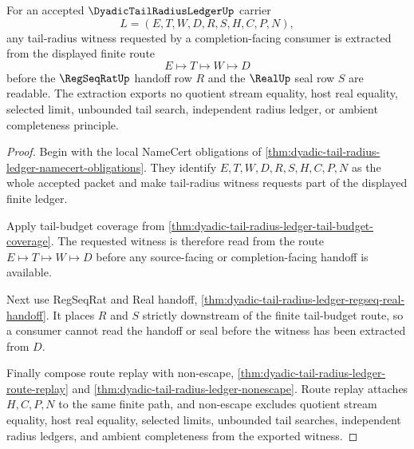 \begin{theorem}
\label{thm:dyadic-tail-radius-ledger-tail-radius-witness-extraction}
For an accepted $\DyadicTailRadiusLedgerUp$ carrier
$$
L=(E,T,W,D,R,S,H,C,P,N),
$$
any tail-radius witness requested by a completion-facing consumer is extracted from the displayed finite route
$$
E \longmapsto T \longmapsto W \longmapsto D
$$
before the $\RegSeqRatUp$ handoff row $R$ and the $\RealUp$ seal row $S$ are readable. The extraction exports no quotient stream equality, host real equality, selected limit, unbounded tail search, independent radius ledger, or ambient completeness principle.
\end{theorem}
\begin{proof}
Begin with the local NameCert obligations of \autoref{thm:dyadic-tail-radius-ledger-namecert-obligations}. They identify $E,T,W,D,R,S,H,C,P,N$ as the whole accepted packet and make tail-radius witness requests part of the displayed finite ledger.

Apply tail-budget coverage from \autoref{thm:dyadic-tail-radius-ledger-tail-budget-coverage}. The requested witness is therefore read from the route $E \longmapsto T \longmapsto W \longmapsto D$ before any source-facing or completion-facing handoff is available.

Next use RegSeqRat and Real handoff, \autoref{thm:dyadic-tail-radius-ledger-regseq-real-handoff}. It places $R$ and $S$ strictly downstream of the finite tail-budget route, so a consumer cannot read the handoff or seal before the witness has been extracted from $D$.

Finally compose route replay with non-escape, \autoref{thm:dyadic-tail-radius-ledger-route-replay} and \autoref{thm:dyadic-tail-radius-ledger-nonescape}. Route replay attaches $H,C,P,N$ to the same finite path, and non-escape excludes quotient stream equality, host real equality, selected limits, unbounded tail searches, independent radius ledgers, and ambient completeness from the exported witness.
\end{proof}

